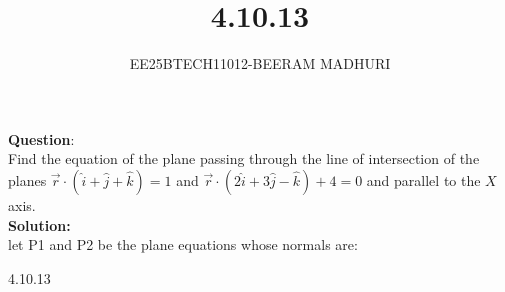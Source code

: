 \documentclass[journal]{IEEEtran}
\begin{document}

\vspace{3cm}

\title{4.10.13}
\author{EE25BTECH11012-BEERAM MADHURI}
{\let\newpage\relax\maketitle}

\renewcommand{\thefigure}{\theenumi}
\renewcommand{\thetable}{\theenumi}
\setlength{\intextsep}{10pt} %


\renewcommand{\thetable}{\theenumi}
\textbf{Question}:\\Find the equation of the plane passing through the line of intersection of the planes
$\vec{r} \cdot (\hat{i} + \hat{j} + \hat{k}) = 1$ and $\vec{r} \cdot (2\hat{i} + 3\hat{j} - \hat{k}) + 4 = 0$ and parallel to the $X$ axis.\\
\textbf{Solution:}\\
let P1 and P2 be the plane equations whose normals are:
\begin{table}[h!]
    \centering
    
    \caption{4.10.13}
    \label{table 4.10.13}
\end{table}
\end{document}
